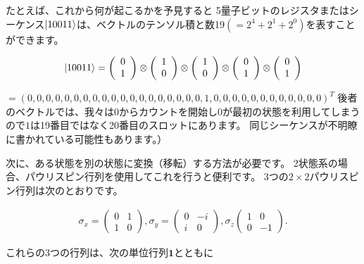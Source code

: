 たとえば、これから何が起こるかを予見すると
5量子ビットのレジスタまたはシーケンス$\ket{10011}$は、ベクトルのテンソル積と数19$(= 2^4 + 2^1 + 2^0)$を表すことができます。

\begin{align}
\ket{10011} = 
\left( \begin{array}{ccc}
 0 \\
 1 
\end{array} \right) 
\otimes
\left( \begin{array}{ccc}
 1 \\
 0 
\end{array} \right)
\otimes
\left( \begin{array}{ccc}
 1 \\
 0 
\end{array} \right)
\otimes
\left( \begin{array}{ccc}
 0 \\
 1 
\end{array} \right)
\otimes
\left( \begin{array}{ccc}
 0 \\
 1 
\end{array} \right)
\end{align}

$= (0,0,0,0,0,0,0,0,0,0,0,0,0,0,0,0,0,0,0,1,0,0,0,0,0,0,0,0,0,0,0,0)^T$
後者のベクトルでは、我々は0からカウントを開始し0が最初の状態を利用してしまうので$1$は19番目ではなく20番目のスロットにあります。 同じシーケンスが不明瞭に書かれている可能性もあります。）

次に、ある状態を別の状態に変換（移転）する方法が必要です。 2状態系の場合、パウリスピン行列を使用してこれを行うと便利です。 3つの$2 \times 2$パウリスピン行列は次のとおりです。

\begin{align}
\sigma_x = 
\left( \begin{array}{ccc}
 0 & 1 \\
 1 & 0
\end{array} \right) 
,
\sigma_y = 
\left( \begin{array}{ccc}
 0 & -i \\
 i & 0
\end{array} \right)
,
\sigma_z
\left( \begin{array}{ccc}
 1 & 0\\
 0 & -1
\end{array} \right)
.
\end{align}

これらの3つの行列は、次の単位行列$\mathbf{1}$とともに

